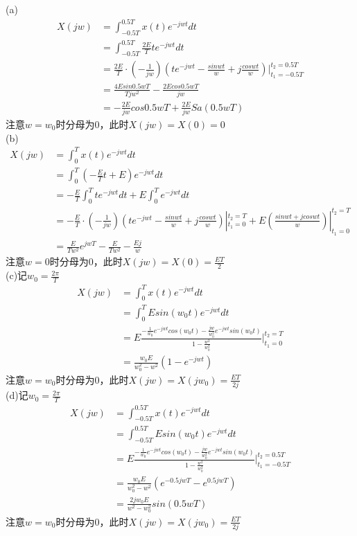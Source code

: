 \documentclass[answers]{exam}  %
\begin{document}
\begin{questions}
\begin{solution}
	(a)\begin{align*}
		X(jw)&=\int_{-0.5T}^{0.5T}x(t)e^{-jwt}dt\\
		&=\int_{-0.5T}^{0.5T}\frac{2E}{T}te^{-jwt}dt\\
		&=\frac{2E}{T}\cdot(-\frac{1}{jw})(te^{-jwt}-\frac{sinwt}{w}+j\frac{coswt}{w})|_{t_1=-0.5T}^{t_2=0.5T}\\
		&=\frac{4Esin0.5wT}{Tjw^2}-\frac{2Ecos0.5wT}{jw}\\
		&=-\frac{2E}{jw}cos0.5wT+\frac{2E}{jw}Sa(0.5wT)
	\end{align*}
	注意$w=w_0$时分母为0，此时$X(jw)=X(0)=0$
	\\
	(b)\begin{align*}
		X(jw)&=\int_0^Tx(t)e^{-jwt}dt\\
		&=\int_0^T(-\frac{E}{T}t+E)e^{-jwt}dt\\
		&=-\frac{E}{T}\int_0^Tte^{-jwt}dt+E\int_0^Te^{-jwt}dt\\
		&=-\frac{E}{T}\cdot(-\frac{1}{jw})(te^{-jwt}-\frac{sinwt}{w}+j\frac{coswt}{w})|_{t_1=0}^{t_2=T}+E(\frac{sinwt+jcoswt}{w})|_{t_1=0}^{t_2=T}\\
		&=\frac{E}{Tw^2}e^{jwT}-\frac{E}{Tw^2}-\frac{Ej}{w}
	\end{align*}
	注意$w=0$时分母为0，此时$X(jw)=X(0)=\frac{ET}{2}$
	\\
	(c)记$w_0=\frac{2\pi}{T}$\\
	\begin{align*}
		X(jw)&=\int_0^Tx(t)e^{-jwt}dt\\
		&=\int_0^TEsin(w_0t)e^{-jwt}dt\\
		&=E\frac{-\frac{1}{w_0}e^{-jwt}cos(w_0t)-\frac{jw}{w_0^2}e^{-jwt}sin(w_0t)}{1-\frac{w^2}{w^2_0}}|_{t_1=0}^{t_2=T}\\
		&=\frac{w_0E}{w_0^2-w^2}(1-e^{-jwt})
	\end{align*}
	注意$w=w_0$时分母为0，此时$X(jw)=X(jw_0)=\frac{ET}{2j}$
	\\
	(d)记$w_0=\frac{2\pi}{T}$\\
	\begin{align*}
		X(jw)&=\int_{-0.5T}^{0.5T}x(t)e^{-jwt}dt\\
		&=\int_{-0.5T}^{0.5T}Esin(w_0t)e^{-jwt}dt\\
		&=E\frac{-\frac{1}{w_0}e^{-jwt}cos(w_0t)-\frac{jw}{w_0^2}e^{-jwt}sin(w_0t)}{1-\frac{w^2}{w^2_0}}|_{t_1=-0.5T}^{t_2=0.5T}\\
		&=\frac{w_0E}{w_0^2-w^2}(e^{-0.5jwT}-e^{0.5jwT})\\
		&=\frac{2jw_0E}{w^2-w_0^2}sin(0.5wT)
	\end{align*}
	注意$w=w_0$时分母为0，此时$X(jw)=X(jw_0)=\frac{ET}{2j}$
\end{solution}


\end{questions}
\end{document}
